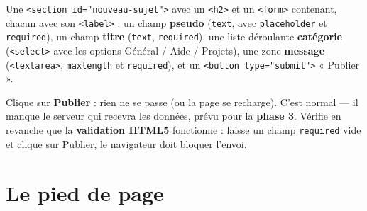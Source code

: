 \documentclass[a4paper,11pt]{article}
\begin{document}
\begin{tcolorbox}[definition, title={À produire}]
Une \texttt{<section id="nouveau-sujet">} avec un \texttt{<h2>} et un \texttt{<form>} contenant, chacun avec son \texttt{<label>} : un champ \textbf{pseudo} (\texttt{text}, avec \texttt{placeholder} et \texttt{required}), un champ \textbf{titre} (\texttt{text}, \texttt{required}), une liste déroulante \textbf{catégorie} (\texttt{<select>} avec les options Général / Aide / Projets), une zone \textbf{message} (\texttt{<textarea>}, \texttt{maxlength} et \texttt{required}), et un \texttt{<button type="submit">} « Publier ».
\end{tcolorbox}

\begin{tcolorbox}[attention, title={Le formulaire ne « part » nulle part}]
Clique sur \textbf{Publier} : rien ne se passe (ou la page se recharge). C'est normal --- il manque le serveur qui recevra les données, prévu pour la \textbf{phase 3}. Vérifie en revanche que la \textbf{validation HTML5} fonctionne : laisse un champ \texttt{required} vide et clique sur Publier, le navigateur doit bloquer l'envoi.
\end{tcolorbox}

\section{Le pied de page}

\vspace{2pt}
\begin{center}
\end{center}
\end{document}
